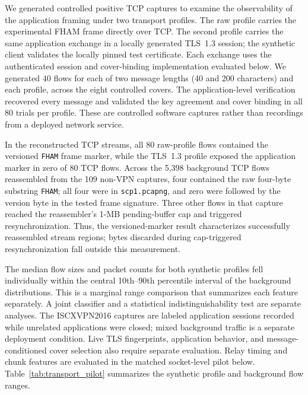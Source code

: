 \documentclass[preprint,12pt]{elsarticle}
\theoremstyle{plain}
\begin{document}
We generated controlled positive TCP captures to examine the observability of
the application framing under two transport profiles. The raw profile carries
the experimental FHAM frame directly over TCP. The second profile carries the
same application exchange in a locally generated TLS~1.3 session; the synthetic
client validates the locally pinned test certificate. Each exchange uses the
authenticated session and cover-binding implementation evaluated below. We
generated 40 flows for each of two message lengths (40 and 200 characters) and
each profile, across the eight controlled covers. The application-level
verification recovered every message and validated the key agreement and
cover binding in all 80 trials per profile. These are controlled software captures rather than recordings from a deployed
network service.

In the reconstructed TCP streams, all 80 raw-profile flows contained the
versioned \texttt{FHAM} frame marker, while the TLS~1.3 profile exposed the application marker in zero of 80 TCP
flows. Across the 5,398 background TCP
flows reassembled from the 109 non-VPN captures, four contained the raw
four-byte substring \texttt{FHAM}; all four were in \texttt{scp1.pcapng}, and
zero were followed by the version byte in the tested frame signature. Three
other flows in that capture reached the reassembler's 1-MB pending-buffer cap
and triggered resynchronization. Thus, the versioned-marker result characterizes successfully reassembled
stream regions; bytes discarded during cap-triggered resynchronization fall
outside this measurement.

The median flow sizes and packet counts for both synthetic profiles fell
individually within the central 10th--90th percentile interval of the
background distributions. This is a marginal range comparison that summarizes each feature separately.
A joint classifier and a statistical indistinguishability test are separate
analyses. The ISCXVPN2016 captures are labeled application sessions recorded
while unrelated applications were closed; mixed background traffic is a
separate deployment condition. Live TLS fingerprints, application behavior,
and message-conditioned cover selection also require separate evaluation. Relay timing and chunk features are evaluated in the matched
socket-level pilot below. Table~\ref{tab:transport_pilot} summarizes the
synthetic profile and background flow ranges.

\begin{table}[H]
\centering
\small
\caption{Synthetic positive-flow transport pilot and marginal comparison with reassembled non-VPN TCP flows.}
\label{tab:transport_pilot}

\end{table}
\end{document}
